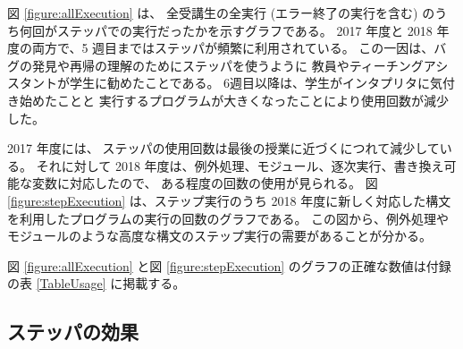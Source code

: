 図 \ref{figure:allExecution} は、
全受講生の全実行 (エラー終了の実行を含む) のうち何回がステッパでの実行だったかを示すグラフである。
2017 年度と 2018 年度の両方で、5 週目まではステッパが頻繁に利用されている。
この一因は、バグの発見や再帰の理解のためにステッパを使うように
教員やティーチングアシスタントが学生に勧めたことである。
6週目以降は、学生がインタプリタに気付き始めたことと
実行するプログラムが大きくなったことにより使用回数が減少した。

2017 年度には、ステッパの使用回数は最後の授業に近づくにつれて減少している。
それに対して 2018 年度は、例外処理、モジュール、逐次実行、書き換え可能な変数に対応したので、
ある程度の回数の使用が見られる。
図 \ref{figure:stepExecution} は、ステップ実行のうち
2018 年度に新しく対応した構文を利用したプログラムの実行の回数のグラフである。
この図から、例外処理やモジュールのような高度な構文のステップ実行の需要があることが分かる。

図 \ref{figure:allExecution} と図 \ref{figure:stepExecution}
のグラフの正確な数値は付録の表 \ref{TableUsage} に掲載する。

\subsection{ステッパの効果}
\label{subsection:result__effects}

